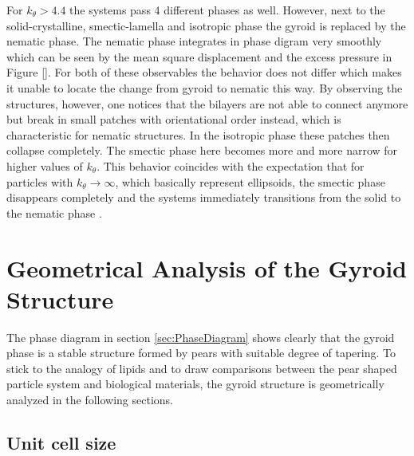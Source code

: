 \documentclass[epj,onecolumn]{webofc}
\begin{document}
For $k_{\theta}>4.4$ the systems pass 4 different phases as well. However, next to the solid-crystalline, smectic-lamella and isotropic phase the gyroid is replaced by the nematic phase. The nematic phase integrates in phase 
digram very smoothly which can be seen by the mean square displacement and the excess pressure in Figure \ref{}. For both of these observables the behavior does not differ which makes it unable to locate the change from 
gyroid to nematic this way. By observing the structures, however, one notices that the bilayers are not able to connect anymore but  break in small patches with orientational order instead, which is characteristic for nematic 
structures. In the isotropic phase these patches then collapse completely. The smectic phase here becomes more and more narrow for higher values of $k_{\theta}$. This behavior coincides with the expectation that for particles 
with $k_{\theta}\rightarrow\infty$, which basically represent ellipsoids, the smectic phase disappears completely and the systems immediately transitions from the solid to the nematic phase \cite{}. 


\section{Geometrical Analysis of the Gyroid Structure}
\label{sec:GeometricalAnalysis}

The phase diagram in section \ref{sec:PhaseDiagram} shows clearly that the gyroid phase is a stable structure formed by pears with suitable degree of tapering. To stick to the analogy of lipids and to draw comparisons between 
the pear shaped particle system and biological materials, the gyroid structure is geometrically analyzed in the following sections.   

\subsection{Unit cell size}
\label{sec:Unit_Cell}
\end{document}
